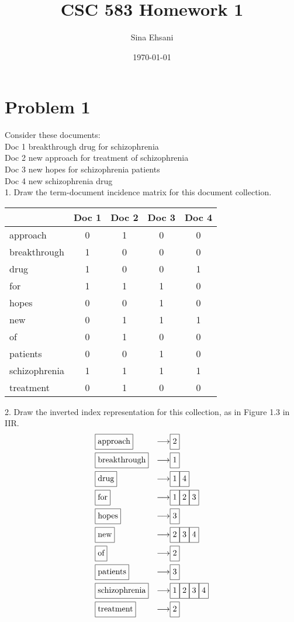 \documentclass{article}
\title{CSC 583 Homework 1}
\author{Sina Ehsani}
\date{\today}
\newcommand*{\mybox}[1]{\framebox{\strut #1}}
\begin{document}
\maketitle


\section{Problem 1}


Consider these documents:\\
Doc 1 breakthrough drug for schizophrenia \\
Doc 2 new approach for treatment of schizophrenia \\
Doc 3 new hopes for schizophrenia patients \\
Doc 4 new schizophrenia drug \\

1. Draw the term-document incidence matrix for this document collection.
\\

\begin{center}
\begin{tabular}{ l | c c c c }
  & Doc 1 & Doc 2 & Doc 3 & Doc 4 \\
  \hline
  approach & 0 & 1 & 0 & 0 \\
  breakthrough & 1 & 0 & 0 & 0\\
  drug & 1 & 0 & 0 & 1\\
  for & 1 & 1 & 1 & 0\\
  hopes & 0 & 0 & 1 & 0\\
  new & 0 & 1 & 1 & 1\\
  of & 0 & 1 & 0 & 0\\
  patients & 0 & 0 & 1 & 0\\
  schizophrenia & 1 & 1 & 1 & 1\\
  treatment & 0 & 1 & 0 & 0\\
\end{tabular}
\end{center}

2. Draw the inverted index representation for this collection, as in Figure 1.3 in IIR.
\begin{align}
& \mybox{approach} & \longrightarrow  &\mybox{2} \\
& \mybox{breakthrough} &  \longrightarrow & \mybox{1} \\
& \mybox{drug} & \longrightarrow& \mybox{1}\mybox{4}\\
& \mybox{for} & \longrightarrow & \mybox{1}\mybox{2}\mybox{3} \\
& \mybox{hopes} & \longrightarrow & \mybox{3} \\
& \mybox{new} & \longrightarrow & \mybox{2}\mybox{3}\mybox{4}\\
& \mybox{of} & \longrightarrow& \mybox{2}\\
& \mybox{patients} & \longrightarrow & \mybox{3} \\
& \mybox{schizophrenia} & \longrightarrow & \mybox{1} \mybox{2}\mybox{3}\mybox{4}\\
& \mybox{treatment} & \longrightarrow& \mybox{2} 
\end{align}
\end{document}
